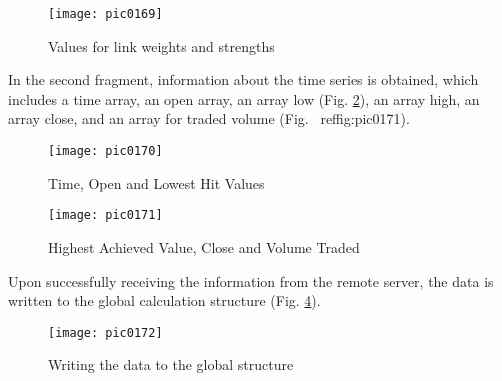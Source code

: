 \begin{figure}[h]
\centering
\texttt{[image: pic0169]}
\caption{Values for link weights and strengths}
\label{fig:pic0169}
\end{figure}
\FloatBarrier

In the second fragment, information about the time series is obtained, which includes a time array, an open array, an array low (Fig. \ref{fig:pic0170}), an array high, an array close, and an array for traded volume (Fig. \ ref{fig:pic0171}).

\begin{figure}[h]
\centering
\texttt{[image: pic0170]}
\caption{Time, Open and Lowest Hit Values}
\label{fig:pic0170}
\end{figure}
\FloatBarrier

\begin{figure}[h]
\centering
\texttt{[image: pic0171]}
\caption{Highest Achieved Value, Close and Volume Traded}
\label{fig:pic0171}
\end{figure}
\FloatBarrier

Upon successfully receiving the information from the remote server, the data is written to the global calculation structure (Fig. \ref{fig:pic0172}).

\begin{figure}[h]
\centering
\texttt{[image: pic0172]}
\caption{Writing the data to the global structure}
\label{fig:pic0172}
\end{figure}
\FloatBarrier

